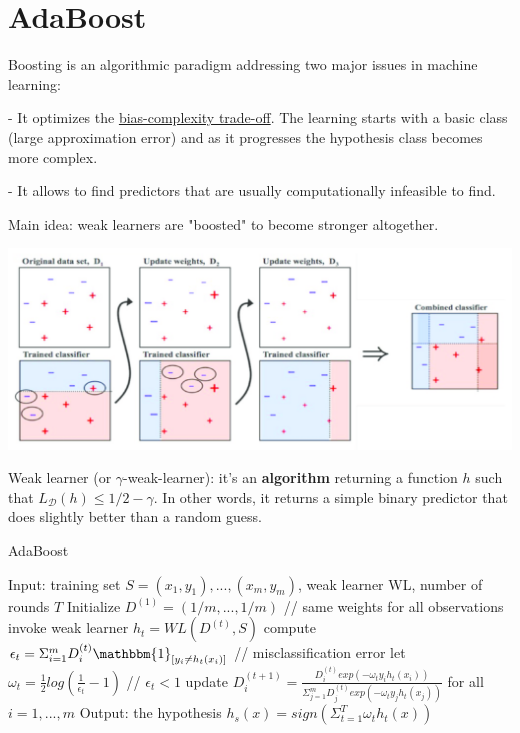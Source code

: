 \section*{AdaBoost}

\label{sec:adaboost}

Boosting is an algorithmic paradigm addressing two major issues in machine learning:

- It optimizes the \hyperref[sec:bias-complexity-trade-off]{bias-complexity trade-off}. The learning starts with a basic class (large approximation error) and as it progresses the hypothesis class becomes more complex.

- It allows to find predictors that are usually computationally infeasible to find.

\vspace{5mm}

Main idea: weak learners are "boosted" to become stronger altogether.

\begin{center}
\includegraphics[scale=0.3]{AdaBoost_Schema.png}
\end{center}

Weak learner (or $\gamma$-weak-learner): it's an \textbf{algorithm} returning a function $h$ such that $L_{\mathcal{D}}(h) \leq 1/2 - \gamma$. In other words, it returns a simple binary predictor that does slightly better than a random guess.

\vspace{5mm}

\begin{algorithm}
\caption{AdaBoost}
\begin{algorithmic}
\State Input: training set $S=(x_1,y_1),...,(x_m,y_m)$, weak learner WL, number of rounds $T$
\State Initialize $D^{(1)} = (1/m,...,1/m)$ // same weights for all observations
\State invoke weak learner $h_t = WL(D^{(t)},S)$
\State compute $\epsilon_t = \Sigma_{i=1}^m D_i^{(t)} \mathbbm{1}_{[y_i \neq h_t(x_i)]}$ // misclassification error
\State let $\omega_t = \frac{1}{2} log(\frac{1}{\epsilon_t}-1)$ // $\epsilon_t < 1$
\State update $D_i^{(t+1)} = \frac{D_i^{(t)} exp(-\omega_t y_i h_t(x_i))}{\Sigma_{j=1}^m D_j^{(t)} exp(-\omega_t y_j h_t(x_j))}$ for all $i=1,...,m$
\EndFor
\State Output: the hypothesis $h_s(x) = sign(\Sigma_{t=1}^T \omega_t h_t (x))$
\end{algorithmic}
\end{algorithm}

